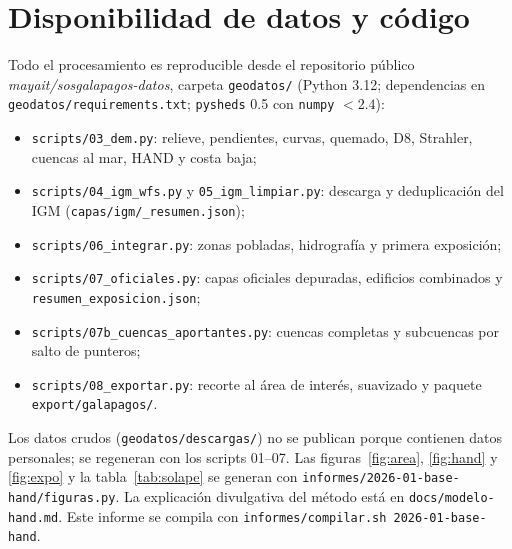 \documentclass{sosg-informe}
\begin{document}
\section*{Disponibilidad de datos y código}
{\small Todo el procesamiento es reproducible desde el repositorio público \emph{mayait/sosgalapagos-datos}, carpeta \texttt{geodatos/} (Python 3.12; dependencias en \texttt{geodatos/requirements.txt}; \texttt{pysheds} 0.5 con \texttt{numpy} $< 2.4$):
\begin{itemize}
  \item \texttt{scripts/03\_dem.py}: relieve, pendientes, curvas, quemado, D8, Strahler, cuencas al mar, HAND y costa baja;
  \item \texttt{scripts/04\_igm\_wfs.py} y \texttt{05\_igm\_limpiar.py}: descarga y deduplicación del IGM (\texttt{capas/igm/\_resumen.json});
  \item \texttt{scripts/06\_integrar.py}: zonas pobladas, hidrografía y primera exposición;
  \item \texttt{scripts/07\_oficiales.py}: capas oficiales depuradas, edificios combinados y \texttt{resumen\_exposicion.json};
  \item \texttt{scripts/07b\_cuencas\_aportantes.py}: cuencas completas y subcuencas por salto de punteros;
  \item \texttt{scripts/08\_exportar.py}: recorte al área de interés, suavizado y paquete \texttt{export/galapagos/}.
\end{itemize}
Los datos crudos (\texttt{geodatos/descargas/}) no se publican porque contienen datos personales; se regeneran con los scripts 01--07. Las figuras~\ref{fig:area}, \ref{fig:hand} y \ref{fig:expo} y la tabla~\ref{tab:solape} se generan con \texttt{informes/2026-01-base-hand/figuras.py}. La explicación divulgativa del método está en \texttt{docs/modelo-hand.md}. Este informe se compila con \texttt{informes/compilar.sh 2026-01-base-hand}.\par}



\end{document}
